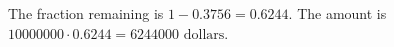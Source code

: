 The fraction remaining is $1-0.3756=0.6244$. The amount is $10000000\cdot0.6244=\boxed{6244000\text{ dollars}}$.
